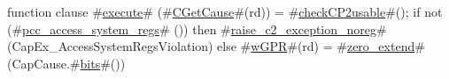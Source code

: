 function clause #\hyperref[zexecute]{execute}# (#\hyperref[zCGetCause]{CGetCause}#(rd)) = 
{
  #\hyperref[zcheckCP2usable]{checkCP2usable}#();
  if not (#\hyperref[zpcczyaccesszysystemzyregs]{pcc\_access\_system\_regs}# ()) then
    #\hyperref[zraisezyc2zyexceptionzynoreg]{raise\_c2\_exception\_noreg}#(CapEx_AccessSystemRegsViolation)
  else
    #\hyperref[zwGPR]{wGPR}#(rd) = #\hyperref[zzzerozyextend]{zero\_extend}#(CapCause.#\hyperref[zbits]{bits}#())
}
